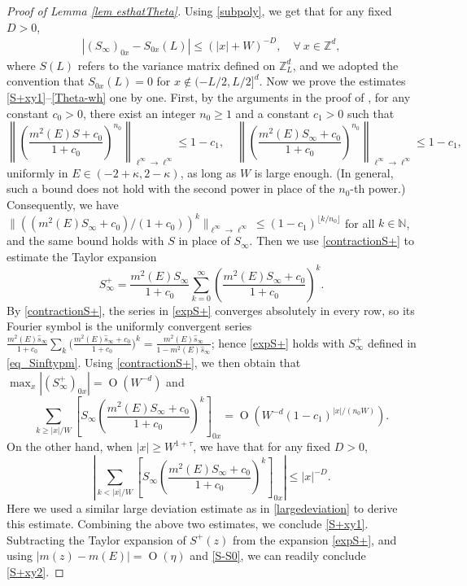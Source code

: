 \documentclass{article}
\newcommand{\1}{\mathds{1}}
\numberwithin{equation}{section}
\newcommand{\be}{\begin{equation}}
\newcommand{\ee}{\end{equation}}
\newcommand{\wh}{\widehat}
\newcommand{\ii}{\mathrm{i}} %
\renewcommand{\leq}{\leqslant}
\renewcommand{\geq}{\geqslant}
\renewcommand{\le}{\leq}
\renewcommand{\ge}{\geq}
\newcommand{\N}{\mathbb{N}}
\newcommand{\Z}{\mathbb{Z}}
\DeclareMathOperator{\OO}{O}
\theoremstyle{plain} %
\theoremstyle{remark}
\begin{document}
\begin{proof}[Proof of Lemma \ref{lem esthatTheta}]
Using \eqref{subpoly}, we get that for any fixed $D>0$,
\begin{align}\label{S-S0} 
	\left|(S_{\infty})_{0x} - S_{0x}(L)\right| \le  (|x|+W)^{-D} , \quad \forall \  x\in \Z^d,
\end{align}
where $S(L)$ refers to the variance matrix defined on $\Z_L^d$, and we adopted the convention that $S_{0x}(L)=0$ for $x\notin (-L/2,L/2]^d$. Now we prove the estimates \eqref{S+xy1}--\eqref{Theta-wh} one by one. 
First, by the arguments in the proof of \cite[Lemma 4.2]{PartII}, for any constant $c_0>0$, there exist an integer $n_0\ge 1$ and a constant $c_1>0$ such that  
\be\label{contractionS+}
\left\|\left( \frac{m^2(E)S +c_0}{1+c_0}\right)^{n_0}\right\|_{\ell^\infty \to \ell^\infty}\le 1-c_1,\quad \left\|\left( \frac{m^2(E)S_\infty+c_0}{1+c_0}\right)^{n_0}\right\|_{\ell^\infty \to \ell^\infty} \le 1-c_1,  
\ee
uniformly in $E\in (-2+\kappa,2-\kappa)$, as long as $W$ is large enough. (In general, such a bound does not hold with the second power in place of the $n_0$-th power.) Consequently, we have $\|((m^2(E)S_\infty+c_0)/(1+c_0))^k\|_{\ell^\infty \to \ell^\infty}\le (1-c_1)^{\lfloor k/n_0\rfloor}$ for all $k\in \N$, and the same bound holds with $S$ in place of $S_\infty$.
Then we use \eqref{contractionS+} to estimate the Taylor expansion 
\be\label{expS+}S_\infty^{+}=\frac{m^2(E) S_\infty}{1+c_0}\sum_{k=0}^{\infty}\left(\frac{m^2(E)S_\infty+c_0}{1+c_0}\right)^k.\ee
By \eqref{contractionS+}, the series in \eqref{expS+} converges absolutely in every row, so its Fourier symbol is the uniformly convergent series $\frac{m^2(E)\wh s_\infty}{1+c_0}\sum_{k}\big(\frac{m^2(E)\wh s_\infty+c_0}{1+c_0}\big)^k=\frac{m^2(E)\wh s_\infty}{1-m^2(E)\wh s_\infty}$; hence \eqref{expS+} holds with $S^+_\infty$ defined in \eqref{eq_Sinftypm}. Using \eqref{contractionS+}, we then obtain that $\max_{x}|(S^+_{\infty})_{0x}|=\OO(W^{-d})$ and
$$ \sum_{k\ge |x|/W } \left[S_\infty\left(\frac{m^2(E)S_\infty+c_0}{1+c_0}\right)^k\right]_{0x}=\OO\left( W^{-d}(1-c_1)^{|x|/(n_0W)}\right).$$
On the other hand, when $|x|\ge W^{1+\tau}$, we have that for any fixed $D>0$,
$$\left|\sum_{k < |x|/W} \left[S_\infty\left(\frac{m^2(E)S_\infty+c_0}{1+c_0}\right)^k\right]_{0x}\right| \le |x|^{-D}.$$ 
Here we used a similar large deviation estimate as in \eqref{largedeviation} to derive this estimate. %
Combining the above two estimates, we conclude \eqref{S+xy1}. Subtracting the Taylor expansion of $S^+(z)$ from the expansion \eqref{expS+}, and using $|m(z)-m(E)|=\OO(\eta)$ and \eqref{S-S0}, we can readily conclude \eqref{S+xy2}.



\end{proof}
\end{document}
